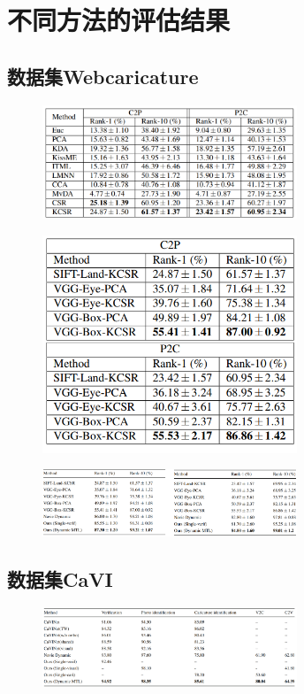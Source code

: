 \section{不同方法的评估结果}
\subsection{数据集Webcaricature}
\begin{figure}[H]
    \centering
    \includegraphics[width=3in]{sections/figs/eval1.png}
    \label{fig:my_label}
\end{figure}
\begin{figure}[H]
    \centering
    \includegraphics[width=3in]{sections/figs/eval2.png}
    \label{fig:my_label}
\end{figure}
\begin{figure}[H]
    \centering
    \includegraphics[width=3in]{sections/figs/eval4.png}
    \label{fig:my_label}
\end{figure}
\subsection{数据集CaVI}
\begin{figure}[H]
    \centering
    \includegraphics[width=3in]{sections/figs/eval3.png}
    \label{fig:my_label}
\end{figure}
